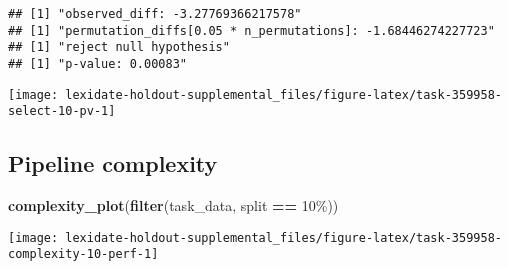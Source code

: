 \documentclass[
]{book}
\newenvironment{Shaded}{\begin{snugshade}}{\end{snugshade}}
\newcommand{\AttributeTok}[1]{\textcolor[rgb]{0.13,0.29,0.53}{#1}}
\newcommand{\DecValTok}[1]{\textcolor[rgb]{0.00,0.00,0.81}{#1}}
\newcommand{\FunctionTok}[1]{\textcolor[rgb]{0.13,0.29,0.53}{\textbf{#1}}}
\newcommand{\NormalTok}[1]{#1}
\newcommand{\OtherTok}[1]{\textcolor[rgb]{0.56,0.35,0.01}{#1}}
\newcommand{\SpecialCharTok}[1]{\textcolor[rgb]{0.81,0.36,0.00}{\textbf{#1}}}
\newcommand{\StringTok}[1]{\textcolor[rgb]{0.31,0.60,0.02}{#1}}
\begin{document}
\begin{Shaded}
\end{Shaded}

\begin{verbatim}
## [1] "observed_diff: -3.27769366217578"
## [1] "permutation_diffs[0.05 * n_permutations]: -1.68446274227723"
## [1] "reject null hypothesis"
## [1] "p-value: 0.00083"
\end{verbatim}

\texttt{[image: lexidate-holdout-supplemental\_files/figure-latex/task-359958-select-10-pv-1]}

\hypertarget{pipeline-complexity-30}{%
\subsection{Pipeline complexity}\label{pipeline-complexity-30}}

\begin{Shaded}
\begin{Highlighting}[]
\FunctionTok{complexity\_plot}\NormalTok{(}\FunctionTok{filter}\NormalTok{(task\_data, split }\SpecialCharTok{==} \StringTok{\textquotesingle{}10\%\textquotesingle{}}\NormalTok{))}
\end{Highlighting}
\end{Shaded}

\texttt{[image: lexidate-holdout-supplemental\_files/figure-latex/task-359958-complexity-10-perf-1]}
\end{document}
